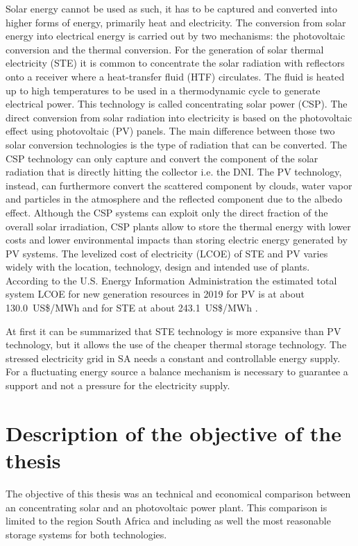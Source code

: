 Solar energy cannot be used as such, it has to be captured and converted into higher forms of energy, primarily heat and electricity. The conversion from solar energy into electrical energy is carried out by two mechanisms: the photovoltaic conversion and the thermal conversion. For the generation of solar thermal electricity (STE) it is common to concentrate the solar radiation with reflectors onto a receiver where a heat-transfer fluid (HTF) circulates. The fluid is heated up to high temperatures to be used in a thermodynamic cycle to generate electrical power. This technology is called concentrating solar power (CSP). The direct conversion from solar radiation into electricity is based on the photovoltaic effect using photovoltaic (PV) panels. The main difference between those two solar conversion technologies is the type of radiation that can be converted. The CSP technology can only capture and convert the  component of the solar radiation that is directly hitting the collector i.e. the DNI. The PV technology, instead, can furthermore convert the scattered component by clouds, water vapor and particles in the atmosphere and the reflected component due to the albedo effect. Although the CSP systems can exploit only the direct fraction of the overall solar irradiation, CSP plants allow to store the thermal energy with lower costs and lower environmental impacts than storing electric energy generated by PV systems. \cite{IEA2014e,EASAC2011} The levelized cost of electricity (LCOE) of STE and PV varies widely with the location, technology, design and intended use of plants. According to the U.S. Energy Information Administration the estimated total system LCOE for new generation resources in 2019 for PV is at about 130.0~US\$/MWh and for STE at about 243.1~US\$/MWh \cite{Outlook2014}. 



At first it can be summarized that STE technology is more expansive than PV technology, but it allows the use of the cheaper thermal storage technology. The stressed electricity grid in SA needs a constant and controllable energy supply. For a fluctuating energy source a balance mechanism is necessary to guarantee a support and not a pressure for the electricity supply. 

\section{Description of the objective of the thesis}
The objective of this thesis was an technical and economical comparison between an concentrating solar and an photovoltaic power plant. This comparison is limited to the region South Africa and including as well the most reasonable storage systems for both technologies. 



